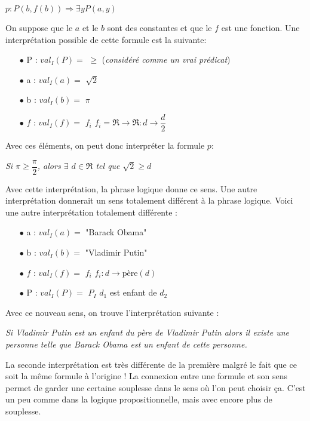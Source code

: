 \begin{center}
$p : P(b,f(b)) \Rightarrow \exists y   P(a,y)$  \\
\vspace{3mm}
\end{center}
On suppose que le $a$ et le $b$ sont des constantes et que le $f$ est une fonction.
Une interprétation possible de cette formule est la suivante:
\begin{itemize}
\item[$\bullet$]P : $val_{I}(P) = $ $ \geq $ \hspace{3mm} (\textit{considéré comme un vrai prédicat})
\item[$\bullet$] a : $val_{I}(a) = $ $ \sqrt{2} $ 
\item[$\bullet$] b : $val_{I}(b) = $ $ \pi $ 
\item[$\bullet$] $f$ : $val_{I}(f) = $ $ f_{i} $ \hspace{3mm} $f_{i}= \Re \rightarrow \Re : d \rightarrow \dfrac{d}{2} $ 
\end{itemize}
Avec ces éléments, on peut donc interpréter la formule $p$:
\begin{center}
\textit{Si $\pi \geq  \dfrac{\pi}{2}$, alors $\exists$ $ d \in \Re$ tel que $\sqrt2 \geq d$ }
\end{center}
Avec cette interprétation, la phrase logique donne ce sens.
Une autre interprétation donnerait un sens totalement différent à la phrase logique. Voici une autre interprétation totalement différente :
\begin{itemize}
\item[$\bullet$] a : $val_{I}(a) = $ "Barack Obama"
\item[$\bullet$] b : $val_{I}(b) = $ "Vladimir Putin"
\item[$\bullet$] $f$ : $val_{I}(f) = $ $ f_{i} $ \hspace{3mm} $f_{i}: d \rightarrow \mathrm{père}(d)$
\item[$\bullet$] P :  $val_{I}(P) = $ $P_{I}$ \hspace{3mm} $d_{1}$ est enfant de $d_{2}$\\
\end{itemize}

Avec ce nouveau sens, on trouve l'interprétation suivante : 
\begin{center}
\textit{Si Vladimir Putin est un enfant du père de Vladimir Putin alors il existe une personne telle que Barack Obama est un enfant de cette personne.}
\end{center}
La seconde interprétation est très différente de la première malgré le fait que ce soit la même formule à l'origine ! La connexion entre une formule et son sens permet de garder une certaine souplesse dans le sens où l'on peut choisir ça. C'est un peu comme dans la logique propositionnelle, mais avec encore plus de souplesse.

